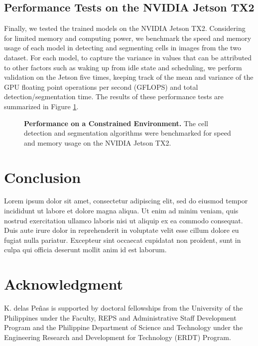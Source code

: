 \documentclass[journal]{IEEEtran}
\begin{document}
\subsection{Performance Tests on the NVIDIA Jetson TX2}
Finally, we tested the trained models on the NVIDIA Jetson TX2. Considering for limited memory and computing power, we benchmark the speed and memory usage of each model in detecting and segmenting cells in images from the two dataset. For each model, to capture the variance in values that can be attributed to other factors such as waking up from idle state and scheduling, we perform validation on the Jetson five times, keeping track of the mean and variance of the GPU floating point operations per second (GFLOPS) and total detection/segmentation time. The results of these performance tests are summarized in Figure \ref{fig:performance_jetson}.
\begin{figure}
\caption{\textbf{Performance on a Constrained Environment.} The cell detection and segmentation algorithms were benchmarked for speed and memory usage on the NVIDIA Jetson TX2.}
\label{fig:performance_jetson}
\end{figure}
\section{Conclusion}
Lorem ipsum dolor sit amet, consectetur adipiscing elit, sed do eiusmod tempor incididunt ut labore et dolore magna aliqua. Ut enim ad minim veniam, quis nostrud exercitation ullamco laboris nisi ut aliquip ex ea commodo consequat. Duis aute irure dolor in reprehenderit in voluptate velit esse cillum dolore eu fugiat nulla pariatur. Excepteur sint occaecat cupidatat non proident, sunt in culpa qui officia deserunt mollit anim id est laborum.


\section*{Acknowledgment}
K. delas Pe\~nas is supported by doctoral fellowships from the University of the Philippines under the Faculty, REPS and Administrative Staff Development Program and the Philippine Department of Science and Technology under the Engineering Research and Development for Technology (ERDT) Program.


\ifCLASSOPTIONcaptionsoff
  \newpage
\fi
\end{document}
